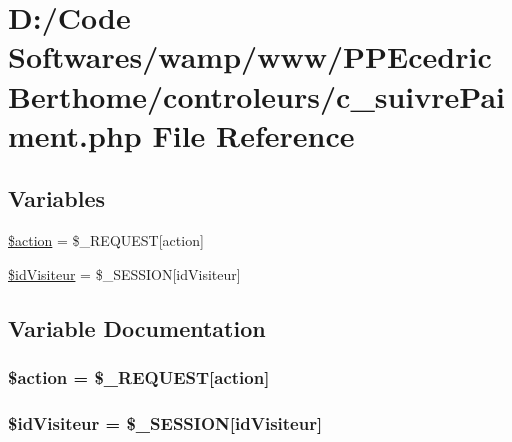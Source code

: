 \hypertarget{c__suivre_paiment_8php}{}\section{D\+:/\+Code Softwares/wamp/www/\+P\+P\+Ecedric\+Berthome/controleurs/c\+\_\+suivre\+Paiment.php File Reference}
\label{c__suivre_paiment_8php}
\subsection*{Variables}
\begin{DoxyCompactItemize}
\item 
\hyperlink{c__suivre_paiment_8php_aa698a3e72116e8e778be0e95d908ee30}{\$action} = \$\+\_\+\+R\+E\+Q\+U\+E\+ST\mbox{[}\textquotesingle{}action\textquotesingle{}\mbox{]}
\item 
\hyperlink{c__suivre_paiment_8php_a06480cb765d32df12f67a3589b6b9507}{\$id\+Visiteur} = \$\+\_\+\+S\+E\+S\+S\+I\+ON\mbox{[}\textquotesingle{}id\+Visiteur\textquotesingle{}\mbox{]}
\end{DoxyCompactItemize}


\subsection{Variable Documentation}
\subsubsection[{\texorpdfstring{\$action}{$action}}]{\setlength{\rightskip}{0pt plus 5cm}\$action = \$\+\_\+\+R\+E\+Q\+U\+E\+ST\mbox{[}\textquotesingle{}action\textquotesingle{}\mbox{]}}\hypertarget{c__suivre_paiment_8php_aa698a3e72116e8e778be0e95d908ee30}{}\label{c__suivre_paiment_8php_aa698a3e72116e8e778be0e95d908ee30}
\subsubsection[{\texorpdfstring{\$id\+Visiteur}{$idVisiteur}}]{\setlength{\rightskip}{0pt plus 5cm}\$id\+Visiteur = \$\+\_\+\+S\+E\+S\+S\+I\+ON\mbox{[}\textquotesingle{}id\+Visiteur\textquotesingle{}\mbox{]}}\hypertarget{c__suivre_paiment_8php_a06480cb765d32df12f67a3589b6b9507}{}\label{c__suivre_paiment_8php_a06480cb765d32df12f67a3589b6b9507}

